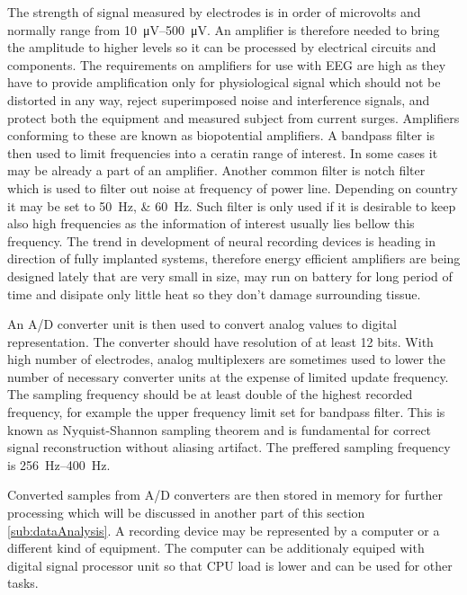 The strength of signal measured by electrodes is in order of microvolts and
normally range from \SIrange{10}{500}{\uV}.\cite{neuralAmp} An amplifier is
therefore needed to bring the amplitude to higher levels so it can be processed
by electrical circuits and components. The requirements on amplifiers for use
with EEG are high as they have to provide amplification only for physiological
signal which should not be distorted in any way, reject superimposed noise and
interference signals, and protect both the equipment and measured subject from
current surges. Amplifiers conforming to these are known as biopotential
amplifiers. \cite{biopotAmp}
A bandpass filter is then used to limit frequencies into a ceratin range of
interest. In some cases it may be already a part of an amplifier.
Another common filter is notch filter which is used to filter out noise
at frequency of power line. Depending on country it may be set to
\SIlist[list-units = single, list-pair-separator = { or }]{50;60}{\Hz}.
\cite{deltaCompNREM} Such filter is only used if it is desirable to keep also
high frequencies as the information of interest usually lies bellow this
frequency.
The trend in development of neural recording devices is heading in direction of
fully implanted systems, therefore energy efficient amplifiers are being
designed lately that are very small in size, may run on battery for long period
of time and disipate only little heat so they don't damage surrounding tissue.
\cite{neuralAmp}

An A/D converter unit is then used to convert analog values to digital
representation. The converter should have resolution of at least 12 bits.
With high number of electrodes, analog multiplexers are sometimes used to lower
the number of necessary converter units at the expense of limited update
frequency. The sampling frequency should be at least double of the highest
recorded frequency, for example the upper frequency limit set for bandpass
filter. This is known as Nyquist-Shannon sampling theorem and is fundamental for
correct signal reconstruction without aliasing artifact. The preffered sampling
frequency is \SIrange{256}{400}{\Hz}. \cite{guidDigEEG}

Converted samples from A/D converters are then stored in memory for further
processing which will be discussed in another part of this section
\ref{sub:dataAnalysis}. A recording device may be represented by a computer or
a different kind of equipment. The computer can be additionaly equiped with
digital signal processor unit so that CPU load is lower and can be used for
other tasks.

